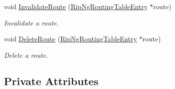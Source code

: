 \begin{DoxyCompactItemize}
void \hyperlink{classns3_1_1RipNg_ae4fc1ca9ed948f3c028fd96fb016f7dd}{Invalidate\+Route} (\hyperlink{classns3_1_1RipNgRoutingTableEntry}{Rip\+Ng\+Routing\+Table\+Entry} $\ast$route)
\begin{DoxyCompactList}\small\item\em Invalidate a route. \end{DoxyCompactList}\item 
void \hyperlink{classns3_1_1RipNg_a9d1204fd821a2a528b250e57ddb0df04}{Delete\+Route} (\hyperlink{classns3_1_1RipNgRoutingTableEntry}{Rip\+Ng\+Routing\+Table\+Entry} $\ast$route)
\begin{DoxyCompactList}\small\item\em Delete a route. \end{DoxyCompactList}\end{DoxyCompactItemize}
\subsection*{Private Attributes}
